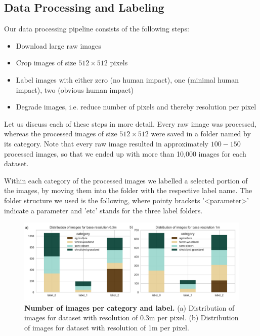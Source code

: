 \subsection{Data Processing and Labeling}
Our data processing pipeline consists of the following steps:
\begin{itemize}
	\item Download large raw images
	\item Crop images of size $512\times512$ pixels
	\item Label images with either zero (no human impact), one (minimal human impact), two (obvious human impact)
	\item Degrade images, i.e. reduce number of pixels and thereby resolution per pixel
\end{itemize}

Let us discuss each of these steps in more detail. Every raw image was processed, whereas the processed images of size $512\times512$ were saved in a folder named by its category. Note that every raw image resulted in approximately $100 - 150$ processed images, so that we ended up with more than 10,000 images for each dataset.

Within each category of the processed images we labelled a selected portion of the images, by moving them into the folder with the respective label name. The folder structure we used is the following, where pointy brackets '<parameter>' indicate a parameter and 'etc' stands for the three label folders.


\begin{figure}[h!]
	\centering
	\captionsetup{width=1\linewidth}
	\includegraphics[width=1\textwidth]{Figures/imstats.pdf}
	\caption{\textbf{Number of images per category and label.} (a) Distribution of images for dataset with resolution of 0.3m per pixel. (b) Distribution of images for dataset with resolution of 1m per pixel.}
	\label{fig:imstats}
\end{figure}

